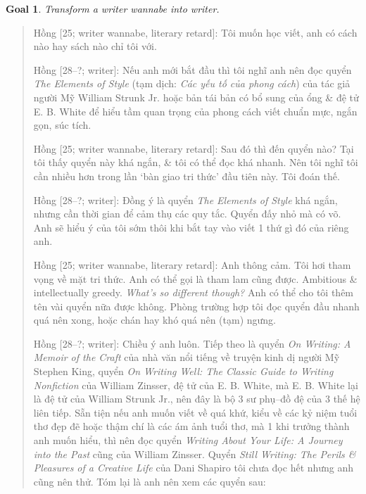 \documentclass[12pt]{article}
\newtheorem{goal}{Goal}
\begin{document}
\begin{goal}
	Transform a writer wannabe into writer.
\end{goal}

\begin{quote}
	{\sf Hồng [25; writer wannabe, literary retard]}: Tôi muốn học viết, anh có cách nào hay sách nào chỉ tôi với.
	
	{\sf Hồng [28--?; writer]}: Nếu anh mới bắt đầu thì tôi nghĩ anh nên đọc quyển {\it The Elements of Style} \cite{Strunk_element_style} (tạm dịch: {\it Các yếu tố của phong cách}) của tác giả người Mỹ {\sc William Strunk Jr.} hoặc bản tái bản có bổ sung \cite{Strunk_White_element_style} của ổng \& đệ tử {\sc E. B. White} để hiểu tầm quan trọng của phong cách viết chuẩn mực, ngắn gọn, súc tích.
	
	{\sf Hồng [25; writer wannabe, literary retard]}: Sau đó thì đến quyển nào? Tại tôi thấy quyển này khá ngắn, \& tôi có thể đọc khá nhanh. Nên tôi nghĩ tôi cần nhiều hơn trong lần `bàn giao tri thức' đầu tiên này. Tôi đoán thế.
	
	{\sf Hồng [28--?; writer]}: Đồng ý là quyển {\it The Elements of Style} khá ngắn, nhưng cần thời gian để cảm thụ các quy tắc. Quyển đấy nhỏ mà có võ. Anh sẽ hiểu ý của tôi sớm thôi khi bắt tay vào viết 1 thứ gì đó của riêng anh.
	
	{\sf Hồng [25; writer wannabe, literary retard]}: Anh thông cảm. Tôi hơi tham vọng về mặt tri thức. Anh có thể gọi là tham lam cũng được. Ambitious \& intellectually greedy. {\it What's so different though?} Anh có thể cho tôi thêm tên vài quyển nữa được không. Phòng trường hợp tôi đọc quyển đầu nhanh quá nên xong, hoặc chán hay khó quá nên (tạm) ngưng.
	
	{\sf Hồng [28--?; writer]}: Chiều ý anh luôn. Tiếp theo là quyển {\it On Writing: A Memoir of the Craft} \cite{King2000,King2010} của nhà văn nổi tiếng về truyện kinh dị người Mỹ {\sc Stephen King}, quyển {\it On Writing Well: The Classic Guide to Writing Nonfiction} \cite{Zinsser2001,Zinsser2016} của {\sc William Zinsser}, đệ tử của {\sc E. B. White}, mà {\sc E. B. White} lại là đệ tử của {\sc William Strunk Jr.}, nên đây là bộ 3 sư phụ--đồ đệ của 3 thế hệ liên tiếp. Sẵn tiện nếu anh muốn viết về quá khứ, kiểu về các kỷ niệm tuổi thơ đẹp đẽ hoặc thậm chí là các ám ảnh tuổi thơ, mà 1 khi trưởng thành anh muốn hiểu, thì nên đọc quyển {\it Writing About Your Life: A Journey into the Past} \cite{Zinsser2005} cũng của {\sc William Zinsser}. Quyển {\it Still Writing: The Perils \& Pleasures of a Creative Life} của {\sc Dani Shapiro} tôi chưa đọc hết nhưng anh cũng nên thử. Tóm lại là anh nên xem các quyển sau:
\end{quote}
\end{document}
